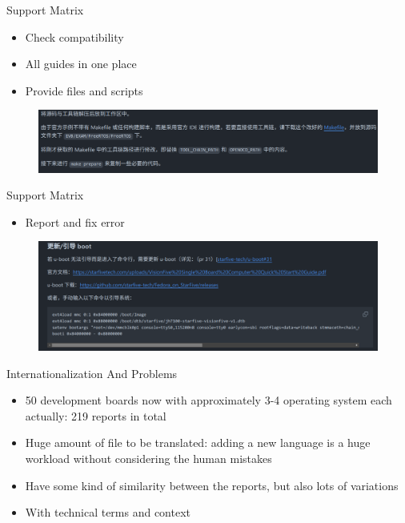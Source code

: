 \documentclass{beamer}
\begin{document}
\begin{frame}{Support Matrix}
    \begin{itemize}
        \item Check compatibility
        \item All guides in one place
        \item Provide files and scripts
    \end{itemize}
    \begin{figure}
        \centering
            \includegraphics[width=\textwidth]{pic/make_doc.png}
    \end{figure}
\end{frame}

\begin{frame}{Support Matrix}
    \begin{itemize}
        \item Report and fix error
    \end{itemize}
    \begin{figure}
        \centering
            \includegraphics[width=\textwidth]{pic/prob.png}
    \end{figure}
\end{frame}

\begin{frame}{Internationalization And Problems}
    \begin{itemize}
        \item 50 development boards now with approximately 3-4 operating system each \newline
        actually: 219 reports in total
        \item Huge amount of file to be translated: adding a new language is a huge workload without considering the human mistakes
        \item Have some kind of similarity between the reports, but also lots of variations
        \item With technical terms and context
    \end{itemize}
\end{frame}
\end{document}
